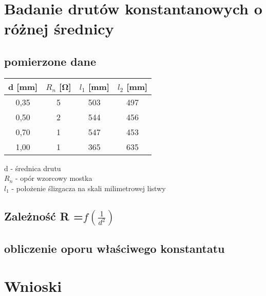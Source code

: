\documentclass{article}
\begin{document}
\section{Badanie drutów konstantanowych o różnej średnicy}
\subsection{pomierzone dane}

\begin{center}
\begin{tabular}{ c |  c | c | c}
d [mm] & $R_n$ [\si{\ohm}] & $l_1$ [mm] & $l_2$ [mm]\\
\hline
 0,35 & 5 & 503 & 497\\ 
 0,50 & 2 & 544 & 456\\ 
 0,70 & 1 & 547 & 453\\ 
 1,00 & 1 & 365 & 635\\ 

\end{tabular}
\end{center}
{d} - średnica drutu\\
$R_n$ - opór wzorcowy mostka\\ 
$l_1$ - położenie ślizgacza na skali milimetrowej listwy\\

\subsection {Zależność R =$ f(\frac{1}{d^2})$}

\subsection {obliczenie oporu właściwego konstantatu}

\section{Wnioski}
	
\end{document}
